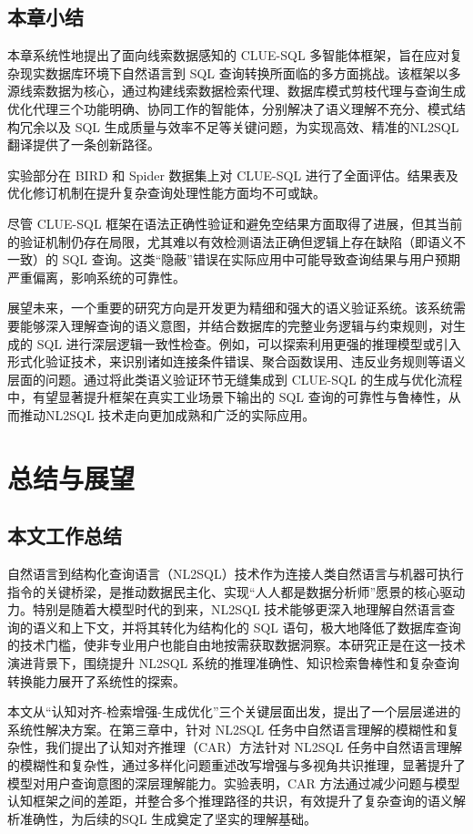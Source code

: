 \documentclass[12pt,a4paper,openright,UTF8]{ctexbook}
\begin{document}
\section{本章小结}

本章系统性地提出了面向线索数据感知的 CLUE-SQL 多智能体框架，旨在应对复杂现实数据库环境下自然语言到 SQL 查询转换所面临的多方面挑战。该框架以多源线索数据为核心，通过构建线索数据检索代理、数据库模式剪枝代理与查询生成优化代理三个功能明确、协同工作的智能体，分别解决了语义理解不充分、模式结构冗余以及 SQL 生成质量与效率不足等关键问题，为实现高效、精准的NL2SQL 翻译提供了一条创新路径。


实验部分在 BIRD 和 Spider 数据集上对 CLUE-SQL 进行了全面评估。结果表及优化修订机制在提升复杂查询处理性能方面均不可或缺。


尽管 CLUE-SQL 框架在语法正确性验证和避免空结果方面取得了进展，但其当前的验证机制仍存在局限，尤其难以有效检测语法正确但逻辑上存在缺陷（即语义不一致）的 SQL 查询。这类“隐蔽”错误在实际应用中可能导致查询结果与用户预期严重偏离，影响系统的可靠性。


展望未来，一个重要的研究方向是开发更为精细和强大的语义验证系统。该系统需要能够深入理解查询的语义意图，并结合数据库的完整业务逻辑与约束规则，对生成的 SQL 进行深层逻辑一致性检查。例如，可以探索利用更强的推理模型或引入形式化验证技术，来识别诸如连接条件错误、聚合函数误用、违反业务规则等语义层面的问题。通过将此类语义验证环节无缝集成到 CLUE-SQL 的生成与优化流程中，有望显著提升框架在真实工业场景下输出的 SQL 查询的可靠性与鲁棒性，从而推动NL2SQL 技术走向更加成熟和广泛的实际应用。

\chapter{总结与展望}


\section{本文工作总结}

自然语言到结构化查询语言（NL2SQL）技术作为连接人类自然语言与机器可执行指令的关键桥梁，是推动数据民主化、实现“人人都是数据分析师”愿景的核心驱动力。特别是随着大模型时代的到来，NL2SQL 技术能够更深入地理解自然语言查询的语义和上下文，并将其转化为结构化的 SQL 语句，极大地降低了数据库查询的技术门槛，使非专业用户也能自由地按需获取数据洞察。本研究正是在这一技术演进背景下，围绕提升 NL2SQL 系统的推理准确性、知识检索鲁棒性和复杂查询转换能力展开了系统性的探索。


本文从“认知对齐-检索增强-生成优化”三个关键层面出发，提出了一个层层递进的系统性解决方案。在第三章中，针对 NL2SQL 任务中自然语言理解的模糊性和复杂性，我们提出了认知对齐推理（CAR）方法针对 NL2SQL 任务中自然语言理解的模糊性和复杂性，通过多样化问题重述改写增强与多视角共识推理，显著提升了模型对用户查询意图的深层理解能力。实验表明，CAR 方法通过减少问题与模型认知框架之间的差距，并整合多个推理路径的共识，有效提升了复杂查询的语义解析准确性，为后续的SQL 生成奠定了坚实的理解基础。
\end{document}
